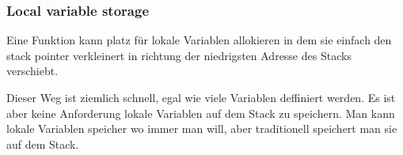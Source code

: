 \subsubsection{Local variable storage}

Eine Funktion kann platz für lokale Variablen allokieren in dem sie einfach den \gls{stack pointer}
verkleinert in richtung der niedrigsten Adresse des Stacks verschiebt. 


Dieser Weg ist ziemlich schnell, egal wie viele Variablen deffiniert werden.
Es ist aber keine Anforderung lokale Variablen auf dem Stack zu speichern.
Man kann lokale Variablen speicher wo immer man will, aber traditionell speichert
man sie auf dem Stack.
